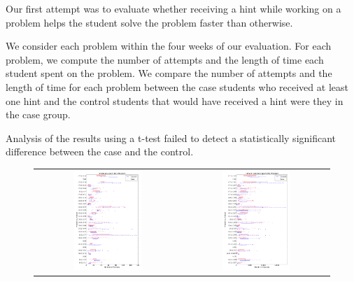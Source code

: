 \documentclass{llncs2e/llncs}
\begin{document}
Our first attempt was to evaluate whether receiving a hint while
working on a problem helps the student solve the problem faster than otherwise.

We consider each problem within the four weeks of our evaluation. For
each problem, we compute the number of attempts and the length of time
each student spent on the problem. We compare the number of attempts
and the length of time for each problem between the case students who
received at least one hint and the control students that would have
received a hint were they in the case group.

Analysis of the results using a t-test failed to detect a
statistically significant difference between the case and the
control. 

\iffalse
\begin{figure}[ht]
  \centering
   \begin{tabular}{c c}
  \includegraphics[width=0.48\textwidth]{image/problem_tries.png} & 
  \includegraphics[width=0.48\textwidth]{image/problem_time.png}

\end{tabular}
\end{figure}
\end{document}
